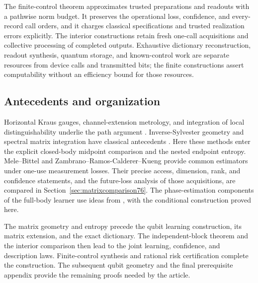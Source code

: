 The finite-control theorem approximates trusted preparations and
readouts with a pathwise norm budget.  It preserves the operational
loss, confidence, and every-record call orders, and it charges
classical specifications and trusted realization errors explicitly.
The interior constructions retain fresh one-call acquisitions and
collective processing of completed outputs.  Exhaustive dictionary
reconstruction, readout synthesis, quantum storage, and known-control
work are separate resources from device calls and transmitted bits;
the finite constructions assert computability without an efficiency
bound for those resources.

\subsection{Antecedents and organization}
Horizontal Kraus gauges, channel-extension metrology, and integration
of local distinguishability underlie the path argument
\cite{FI76,DKG67,DM76,KGAD76,YF76,SD76}.  Inverse-Sylvester
geometry and spectral matrix integration have classical antecedents
\cite{Dittmann76,SZGeom76}.  Here these methods enter the explicit
closed-body midpoint comparison and the nested endpoint entropy.
Mele--Bittel \cite{MB67} and
Zambrano--Ramos-Calderer--Kueng \cite{ZRK76} provide common
estimators under one-use measurement losses.  Their precise access,
dimension, rank, and confidence statements, and the future-loss
analysis of those acquisitions, are compared in
Section~\ref{sec:matrixcomparison76}.  The phase-estimation
components of the full-body learner use ideas from
\cite{HB76,KLY76}, with the conditional construction proved here.

The matrix geometry and entropy precede the qubit learning
construction, its matrix extension, and the exact dictionary.
The independent-block theorem and the interior comparison then
lead to the joint learning, confidence, and description laws.
Finite-control synthesis and rational risk certification complete
the construction.  The subsequent qubit geometry and the final
prerequisite appendix provide the remaining proofs needed by the
article.
